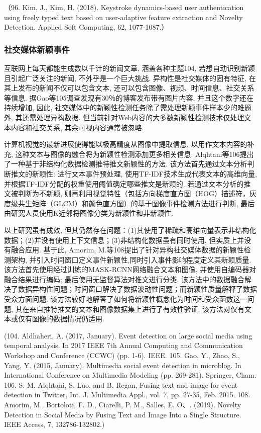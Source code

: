 \documentclass{Style/aas}
\begin{document}
\begin{multicols}{2}
（96.	Kim, J., Kim, H. (2018). Keystroke dynamics-based user authentication using freely typed text based on user-adaptive feature extraction and Novelty Detection. Applied Soft Computing, 62, 1077-1087.）

\subsubsection{社交媒体新颖事件}
互联网上每天都能生成数以千计的新闻文章, 涵盖各种主题104, 若想自动识别新颖且引起广泛关注的新闻, 不外乎是一个巨大挑战. 异构性是社交媒体的固有特征, 在其上发布的新闻不仅可以包含文本, 还可以包含图像、视频、时间信息、社交关系等信息. 据Gao等105调查发现有30％的博客发布带有图片内容, 并且这个数字还在持续增加, 因此, 社交媒体中的新颖性检测任务除了需处理新颖事件样本少的难题外, 其还需处理异构数据. 但当前针对Web内容的大多数新颖性检测技术仅处理文本内容和社交关系, 其余可视内容通常被忽略. 

计算机视觉的最新进展使得能以极高精度从图像中提取信息, 以用作文本内容的补充, 这种文本与图像的融合将为新颖性检测添加更多相关信息. Alqhtani等106提出了一种基于非结构化数据检测推特推文新颖性的方法. 该方法首先通过文本分析判断推文的新颖性: 进行文本事件预处理, 使用TF-IDF技术生成代表文本的高维向量, 并根据TF-IDF分配的权重使用阈值确定哪些推文是新颖的. 若通过文本分析的推文被判断为不新颖, 则再利用视觉特性（包括方向梯度直方图（HOG）描述符，灰度级共生矩阵（GLCM）和颜色直方图）的基于图像事件检测方法进行判断, 最后由研究人员使用K近邻将图像分类为新颖性和非新颖性. 

以上研究虽有成效, 但其仍然存在问题：(1)其使用了稀疏和高维向量表示非结构化数据；(2)并没有使用上下文信息；(3)非结构化数据虽有同时使用, 但实质上并没有融合应用. 基于此, Amorim, M.等108提出了针对异构社交媒体数据的新颖性检测架构, 并引入时间窗口定义事件新颖性,同时引入事件影响程度定义其新颖质量.该方法首先使用经过训练的MASK-RCNN网络融合文本和图像, 并使用自编码器对融合结果进行编码; 最后使用无监督算法对推文进行分类. 该方法中的数据融合解决了数据异构性问题；时间窗口解决了数据波动性问题；而新颖性质量解释了数据受众方面问题. 该方法较好地解答了如何将新颖性概念化为时间和受众函数这一问题, 其在来自推特推文的文本和图像数据集上进行了有效性验证. 该方法对仅有文本或仅有图像的数据情况仍适用.

(104.	Aldhaheri, A. (2017, January). Event detection on large social media using temporal analysis. In 2017 IEEE 7th Annual Computing and Communication Workshop and Conference (CCWC) (pp. 1-6). IEEE.
105.	Gao, Y., Zhao, S., Yang, Y. (2015, January). Multimedia social event detection in microblog. In International Conference on Multimedia Modeling (pp. 269-281). Springer, Cham.
106.	S. M. Alqhtani, S. Luo, and B. Regan, Fusing text and image for event detection in Twitter, Int. J. Multimedia Appl., vol. 7, pp. 27-35, Feb. 2015.
108.	Amorim, M., Bortoloti, F. D., Ciarelli, P. M., Salles, E. O、. (2019). Novelty Detection in Social Media by Fusing Text and Image Into a Single Structure. IEEE Access, 7, 132786-132802.)


\end{multicols}
\end{document}
